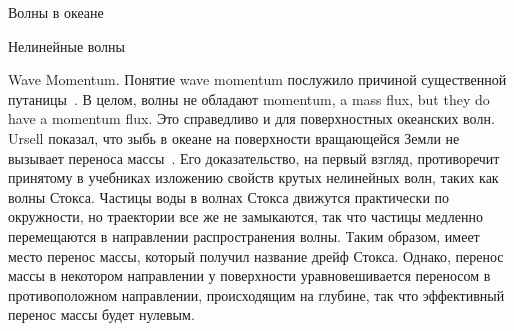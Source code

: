 \begin{chapter}{Волны в океане}
\begin{section}{Нелинейные волны}

\begin{paragraph}{Wave Momentum.}
Понятие wave momentum послужило причиной существенной
путаницы~\cite{McIntyre:1981}. В целом, волны не обладают 
momentum, a mass flux, but they do have a momentum flux. 
Это справедливо и для поверхностных океанских волн.
Ursell показал, что зыбь в океане на поверхности вращающейся 
Земли не вызывает переноса массы~\cite{Ursell:1950}.  
Его доказательство, на первый взгляд, противоречит принятому в учебниках
изложению свойств крутых нелинейных волн, таких как волны Стокса. Частицы
воды в волнах Стокса движутся практически по окружности, но траектории все
же не замыкаются, так что частицы медленно перемещаются в направлении
распространения волны. Таким образом, имеет место перенос массы, который
получил название дрейф Стокса. Однако, перенос массы в некотором направлении
у поверхности уравновешивается переносом в противоположном направлении,
происходящим на глубине, так что эффективный перенос массы будет нулевым.
%
\end{paragraph}
\end{section}


\end{chapter}
